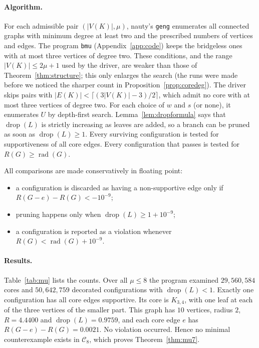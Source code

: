 \documentclass[11pt,a4paper]{article}
\theoremstyle{definition}
\newcommand{\rad}{\operatorname{rad}}
\newcommand{\drop}{\operatorname{drop}}
\newcommand{\C}{\mathcal{C}}
\begin{document}
\paragraph{Algorithm.}
For each admissible pair $(|V(K)|,\mu)$, nauty's \texttt{geng} \cite{nauty} enumerates all connected graphs with minimum degree at least two and the prescribed numbers of vertices and edges. The program \texttt{bmu} (Appendix~\ref{app:code}) keeps the bridgeless ones with at most three vertices of degree two. These conditions, and the range $|V(K)|\le2\mu+1$ used by the driver, are weaker than those of Theorem~\ref{thm:structure}; this only enlarges the search (the runs were made before we noticed the sharper count in Proposition~\ref{prop:coredeg}). The driver skips pairs with $|E(K)|<\lceil(3|V(K)|-3)/2\rceil$, which admit no core with at most three vertices of degree two. For each choice of $w$ and $s$ (or none), it enumerates $U$ by depth-first search. Lemma~\ref{lem:dropformula} says that $\drop(L)$ is strictly increasing as leaves are added, so a branch can be pruned as soon as $\drop(L)\ge1$. Every surviving configuration is tested for supportiveness of all core edges. Every configuration that passes is tested for $R(G)\ge\rad(G)$.

All comparisons are made conservatively in floating point:
\begin{itemize}
\item a configuration is discarded as having a non-supportive edge only if $R(G-e)-R(G)<-10^{-9}$;
\item pruning happens only when $\drop(L)\ge1+10^{-9}$;
\item a configuration is reported as a violation whenever $R(G)<\rad(G)+10^{-9}$.
\end{itemize}

\paragraph{Results.}
Table~\ref{tab:mu} lists the counts. Over all $\mu\le8$ the program examined $29{,}560{,}584$ cores and $50{,}642{,}759$ decorated configurations with $\drop(L)<1$. Exactly one configuration has all core edges supportive. Its core is $K_{3,4}$, with one leaf at each of the three vertices of the smaller part. This graph has $10$ vertices, radius $2$, $R=4.4400$ and $\drop(L)=0.9759$, and each core edge $e$ has $R(G-e)-R(G)=0.0021$. No violation occurred. Hence no minimal counterexample exists in $\C_8$, which proves Theorem~\ref{thm:mu7}.
\end{document}
